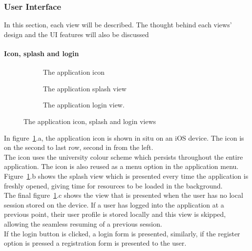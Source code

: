 \documentclass[draft,preprint,12pt,3p]{elsarticle}
\begin{document}
\subsubsection{User Interface}
In this section, each view will be described. The thought behind each views' design and the UI features will also be discussed
\paragraph{Icon, splash and login}
\begin{figure}[H]
    \centering
    \begin{subfigure}[t]{0.32\columnwidth}
        \centering
        \caption{The application icon}
    \end{subfigure}
    \begin{subfigure}[t]{0.32\columnwidth}
        \centering
        \caption{The application splash view}
    \end{subfigure}
    \begin{subfigure}[t]{0.32\columnwidth}
        \centering
        \caption{The application login view.}
    \end{subfigure}
    \caption{The application icon, splash and login views}
    \label{fig:iconsplashlogin}
\end{figure}
In figure~\ref{fig:iconsplashlogin}.a, the application icon is shown in situ on an iOS device. The icon is on the second to last row, second in from the left.\\
The icon uses the university colour scheme which persists throughout the entire application. The icon is also reused as a menu option in the application menu.\\
Figure~\ref{fig:iconsplashlogin}.b shows the splash view which is presented every time the application is freshly opened, giving time for resources to be loaded in the background.\\
The final figure~\ref{fig:iconsplashlogin}.c shows the view that is presented when the user has no local session stored on the device. If a user has logged into the application at a previous point, their user profile is stored locally and this view is skipped, allowing the seamless resuming of a previous session.\\
If the login button is clicked, a login form is presented, similarly, if the register option is pressed a registration form is presented to the user.
\end{document}
